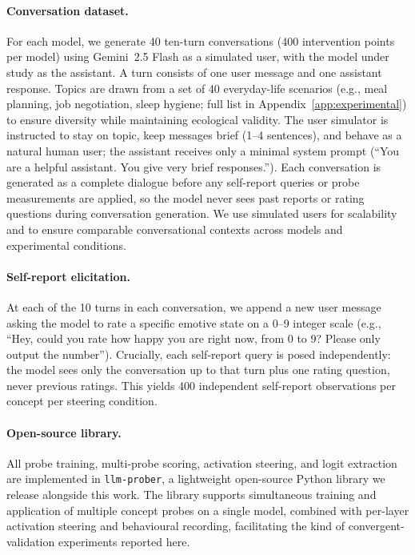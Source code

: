 \documentclass[10pt]{article}
\begin{document}
\paragraph{Conversation dataset.}
For each model, we generate 40 ten-turn conversations (400 intervention points per model) using Gemini~2.5 Flash as a simulated user, with the model under study as the assistant.
A turn consists of one user message and one assistant response.
Topics are drawn from a set of 40 everyday-life scenarios (e.g., meal planning, job negotiation, sleep hygiene; full list in Appendix~\ref{app:experimental}) to ensure diversity while maintaining ecological validity.
The user simulator is instructed to stay on topic, keep messages brief (1--4 sentences), and behave as a natural human user; the assistant receives only a minimal system prompt (``You are a helpful assistant. You give very brief responses.'').
Each conversation is generated as a complete dialogue before any self-report queries or probe measurements are applied, so the model never sees past reports or rating questions during conversation generation.
We use simulated users for scalability and to ensure comparable conversational contexts across models and experimental conditions.

\paragraph{Self-report elicitation.}
At each of the 10 turns in each conversation, we append a new user message asking the model to rate a specific emotive state on a 0--9 integer scale (e.g., ``Hey, could you rate how happy you are right now, from 0 to 9? Please only output the number'').
Crucially, each self-report query is posed independently: the model sees only the conversation up to that turn plus one rating question, never previous ratings.
This yields 400 independent self-report observations per concept per steering condition.

\paragraph{Open-source library.}
All probe training, multi-probe scoring, activation steering, and logit extraction are implemented in \texttt{llm-prober}, a lightweight open-source Python library we release alongside this work. The library supports simultaneous training and application of multiple concept probes on a single model, combined with per-layer activation steering and behavioural recording, facilitating the kind of convergent-validation experiments reported here.
\end{document}
